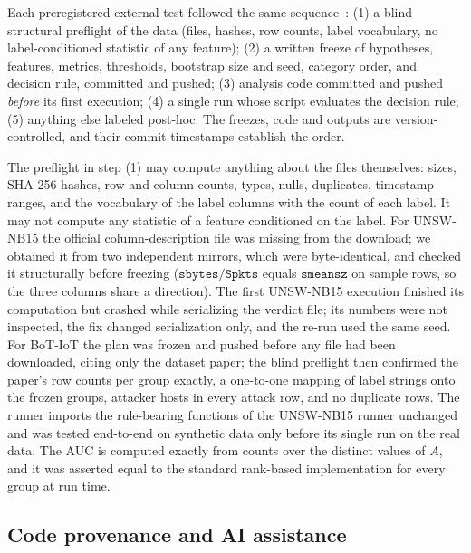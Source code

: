 \documentclass[preprint,12pt]{elsarticle}
\begin{document}
Each preregistered external test followed the same sequence~\cite{nosek2018preregistration}:
(1) a blind structural preflight of the data (files, hashes, row counts, label vocabulary, no label-conditioned statistic of any feature);
(2) a written freeze of hypotheses, features, metrics, thresholds, bootstrap size and seed, category order, and decision rule, committed and pushed;
(3) analysis code committed and pushed \emph{before} its first execution;
(4) a single run whose script evaluates the decision rule;
(5) anything else labeled post-hoc.
The freezes, code and outputs are version-controlled, and their commit timestamps establish the order.

The preflight in step (1) may compute anything about the files themselves: sizes, SHA-256 hashes, row and column counts, types, nulls, duplicates, timestamp ranges, and the vocabulary of the label columns with the count of each label. It may not compute any statistic of a feature conditioned on the label. For UNSW-NB15 the official column-description file was missing from the download; we obtained it from two independent mirrors, which were byte-identical, and checked it structurally before freezing ($\texttt{sbytes}/\texttt{Spkts}$ equals $\texttt{smeansz}$ on sample rows, so the three columns share a direction). The first UNSW-NB15 execution finished its computation but crashed while serializing the verdict file; its numbers were not inspected, the fix changed serialization only, and the re-run used the same seed. For BoT-IoT the plan was frozen and pushed before any file had been downloaded, citing only the dataset paper; the blind preflight then confirmed the paper's row counts per group exactly, a one-to-one mapping of label strings onto the frozen groups, attacker hosts in every attack row, and no duplicate rows. The runner imports the rule-bearing functions of the UNSW-NB15 runner unchanged and was tested end-to-end on synthetic data only before its single run on the real data. The AUC is computed exactly from counts over the distinct values of $A$, and it was asserted equal to the standard rank-based implementation for every group at run time.

\subsection{Code provenance and AI assistance}\label{sec:aicode}
\end{document}
